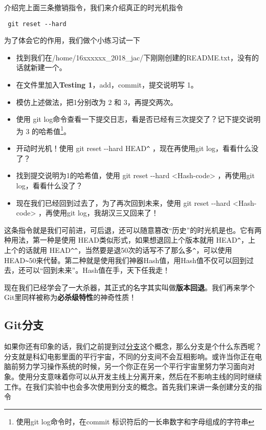 介绍完上面三条撤销指令，我们来介绍真正的时光机指令

\begin{verbatim}
 git reset --hard
\end{verbatim}

为了体会它的作用，我们做个小练习试一下

\begin{exercise}

	\begin{itemize}
		\item 找到我们在/home/16xxxxxx\_2018\_jac/下刚刚创建的README.txt，没有的话就新建一个。
		\item 在文件里加入\textbf{Testing 1}，add，commit，提交说明写 1。
		\item 模仿上述做法，把1分别改为 2 和 3，再提交两次。
		\item 使用 git log命令查看一下提交日志，看是否已经有三次提交了？记下提交说明为 3 的哈希值\footnote{使用git log命令时，在commit 标识符后的一长串数字和字母组成的字符串}。
		\item 开动时光机！使用 git reset -{}-hard HEAD\verb|^| ，现在再使用git log，看看什么没了？
		\item 找到提交说明为1的哈希值，使用 git reset -{}-hard <Hash-code> ，再使用git log，看看什么没了？
		\item 现在我们已经回到过去了，为了再次回到未来，使用 git reset -{}-hard <Hash-code> ，再使用git log，我胡汉三又回来了！
	\end{itemize}
\end{exercise}

这条指令就是我们可前进，可后退，还可以随意篡改“历史”的时光机是也。它有两种用法，第一种是使用 HEAD类似形式，如果想退回上个版本就用 HEAD\verb|^|，上上个的话就用 HEAD\verb|^|\verb|^|，当然要是退50次的话写不了那么多\verb|^|，可以使用HEAD\verb|~|50来代替。第二种就是使用我们神器Hash值，用Hash值不仅可以回到过去，还可以“回到未来”。Hash值在手，天下任我走！

现在我们已经学会了一大杀器，其正式的名字其实叫做\textbf{版本回退}。我们再来学个Git里同样被称为\textbf{必杀级特性}的神奇性质！

\subsection{Git分支}
如果你还有印象的话，我们之前提到过\hyperref[分支]{分支}这个概念，那么分支是个什么东西呢？分支就是科幻电影里面的平行宇宙，不同的分支间不会互相影响。或许当你正在电脑前努力学习操作系统的时候，另一个你正在另一个平行宇宙里努力学习面向对象。使用分支意味着你可以从开发主线上分离开来，然后在不影响主线的同时继续工作。在我们实验中也会多次使用到分支的概念。首先我们来讲一条创建分支的指令\label{git branch}

